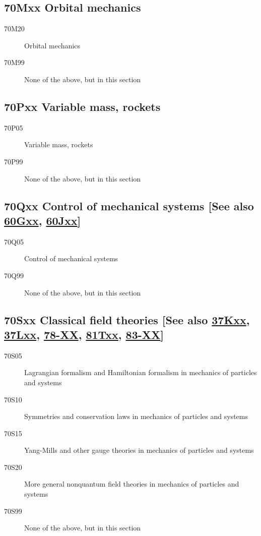 \documentclass[letterpaper]{article}
\begin{document}
\subsection*{70Mxx  Orbital mechanics }\label{70Mxx}
\begin{description}  
\item [70M20]\label{70M20} Orbital mechanics
\item [70M99]\label{70M99} None of the above, but in this section
\end{description}
\subsection*{70Pxx  Variable mass, rockets }\label{70Pxx}
\begin{description}  
\item [70P05]\label{70P05} Variable mass, rockets
\item [70P99]\label{70P99} None of the above, but in this section
\end{description}
\subsection*{70Qxx  Control of mechanical systems [See also \hyperref[60Gxx]{60Gxx}, \hyperref[60Jxx]{60Jxx}] }\label{70Qxx}
\begin{description}  
\item [70Q05]\label{70Q05} Control of mechanical systems
\item [70Q99]\label{70Q99} None of the above, but in this section
\end{description}
\subsection*{70Sxx  Classical field theories [See also \hyperref[37Kxx]{37Kxx}, \hyperref[37Lxx]{37Lxx}, \hyperref[78-XX]{78-XX}, \hyperref[81Txx]{81Txx}, \hyperref[83-XX]{83-XX}] }\label{70Sxx}
\begin{description}  
\item [70S05]\label{70S05} Lagrangian formalism and Hamiltonian formalism in mechanics of particles and systems
\item [70S10]\label{70S10} Symmetries and conservation laws in mechanics of particles and systems
\item [70S15]\label{70S15} Yang-Mills and other gauge theories in mechanics of particles and systems
\item [70S20]\label{70S20} More general nonquantum field theories in mechanics of particles and systems
\item [70S99]\label{70S99} None of the above, but in this section
\end{description}
\end{document}
